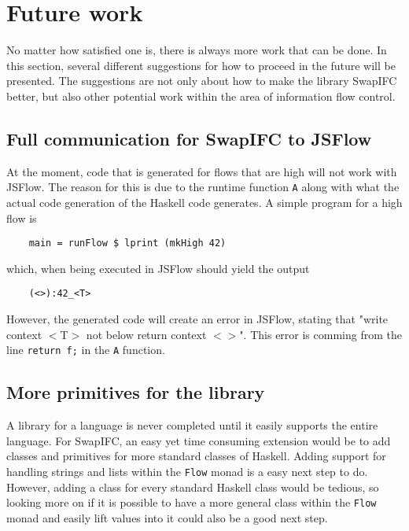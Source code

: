 \chapter{Future work}
\label{chapter:future}
No matter how satisfied one is, there is always more work that can be done. In this section, several different suggestions for how to proceed in the future will be presented. The suggestions are not only about how to make the library SwapIFC better, but also other potential work within the area of information flow control.

\section{Full communication for SwapIFC to JSFlow}
At the moment, code that is generated for flows that are high will not work with JSFlow. The reason for this is due to the runtime function {\tt A} along with what the actual code generation of the Haskell code generates. A simple program for a high flow is
\begin{verbatim}
    main = runFlow $ lprint (mkHigh 42)
\end{verbatim}
which, when being executed in JSFlow should yield the output
\begin{verbatim}
    (<>):42_<T>
\end{verbatim}
However, the generated code will create an error in JSFlow, stating that "write context \(<\)T\(>\) not below return context \(<>\)". This error is comming from the line {\tt return f;} in the {\tt A} function.

\section{More primitives for the library}
\label{chapter:future-primitives}
A library for a language is never completed until it easily supports the entire language. For SwapIFC, an easy yet time consuming extension would be to add classes and primitives for more standard classes of Haskell. Adding support for handling strings and lists within the {\tt Flow} monad is a easy next step to do. However, adding a class for every standard Haskell class would be tedious, so looking more on if it is possible to have a more general class within the {\tt Flow} monad and easily lift values into it could also be a good next step.

